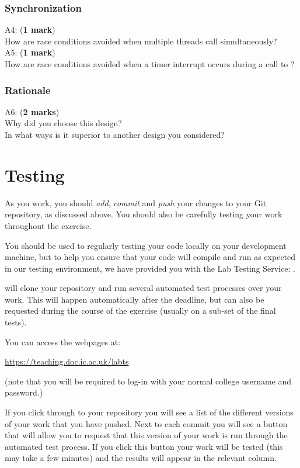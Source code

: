 \documentclass[a4paper,11pt]{article}
\begin{document}
\subsubsection*{Synchronization}
A4: ({\bf 1 mark}) \\
How are race conditions avoided when multiple threads call  simultaneously? \\ 

\noindent A5: ({\bf 1 mark}) \\
How are race conditions avoided when a timer interrupt occurs during a call to ?

\subsubsection*{Rationale}
A6: ({\bf 2 marks}) \\
Why did you choose this design? \\
In what ways is it superior to another design you considered?

\section*{Testing}
As you work, you should \emph{add}, \emph{commit} and \emph{push} your changes to your Git repository, as discussed above.
You should also be carefully testing your work throughout the exercise. 

You should be used to regularly testing your code locally on your development machine, 
but to help you ensure that your code will compile and run as expected in our testing environment,
we have provided you with the Lab Testing Service: .

 will clone your  repository and run several automated test processes over your work.
This will happen automatically after the deadline, but can also be requested during the course of the exercise (usually on a sub-set of the final tests). 

You can access the  webpages at:

\url{https://teaching.doc.ic.ac.uk/labts}

\noindent (note that you will be required to log-in with your normal college username and password.)

If you click through to your  repository you will see a list of the different versions of your work that you have pushed.
Next to each commit you will see a button that will allow you to request that this version of your work is run through the automated test process.
If you click this button your work will be tested (this may take a few minutes) and the results will appear in the relevant column.\\
\end{document}
